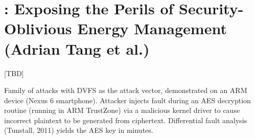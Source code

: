 \section{{\clkscrew{}}: Exposing the Perils of Security-Oblivious Energy
Management (Adrian Tang et al.)}

[TBD]

Family of attacks with DVFS as the attack vector, demonstrated on an ARM device
(Nexus 6 smartphone).
Attacker injects fault during an AES decryption routine (running in ARM
TrustZone) via a malicious kernel driver to cause incorrect plaintext to be
generated from ciphertext.
Differential fault analysis (Tunstall, 2011) yields the AES key in minutes.
